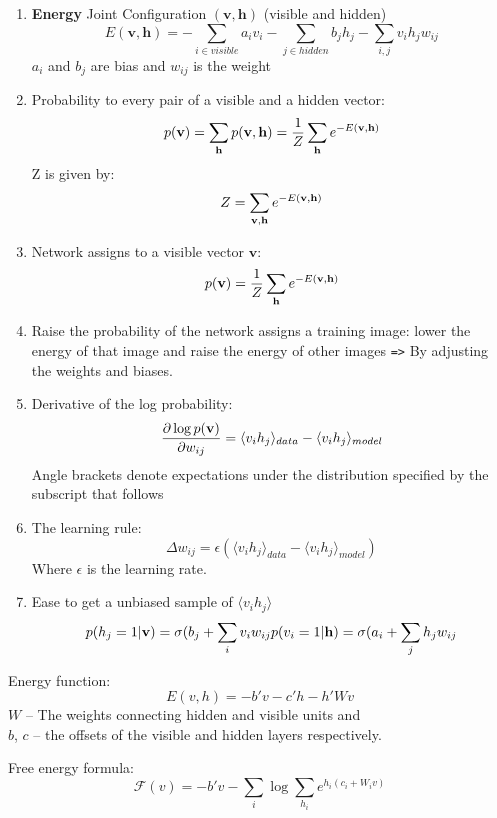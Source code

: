 \begin{enumerate}
    \item \textbf{Energy} Joint Configuration $(\mathbf{v}, \mathbf{h})$  (visible and
        hidden)
        \[ E(\mathbf{v,h}) = -\sum_{i\in visible}a_i v_i - \sum_{j\in hidden}b_j
        h_j - \sum_{i,j}v_ih_jw_{ij}\]
        $a_i$ and $b_j$ are bias and $w_{ij}$ is the weight
    \item  Probability to every pair of a visible and a hidden vector:
        \[ p(\mathbf{v}) = \sum_{\mathbf{h}} p(\mathbf{v}, \mathbf{h}) = \frac{1}{Z}\sum_{\mathbf{h}} e^{-E(\mathbf{v},
        \mathbf{h})}\]
        Z is given by:
        \[ Z = \sum_{\mathbf{v}, \mathbf{h}} e^{-E(\mathbf{v},\mathbf{h})}\]
    \item Network assigns to a visible vector $\mathbf{v}$:
        \[
            p(\mathbf{v}) = \frac{1}{Z}\sum_{\mathbf{h}} e^{-E(\mathbf{v}, \mathbf{h})}
        \]
    \item Raise the probability of the network assigns a training image:
        lower the energy of that image and raise the energy of other images
        \verb|=>| By adjusting the weights and biases.
    \item Derivative of the log probability:
        \[\frac{\partial \log{p(\mathbf{v}})}{\partial w_{ij}} = \langle
        v_ih_j\rangle_{data} - \langle v_i h_j\rangle_{model}\]
        Angle brackets denote expectations under the distribution specified by the
        subscript that follows
    \item 
        The learning rule:
        \[ \Delta w_{ij} = \epsilon(\langle
            v_ih_j\rangle_{data} - \langle v_i h_j\rangle_{model})
        \]
        Where $\epsilon$ is the learning rate.
    \item Ease to get a unbiased sample of $\langle v_ih_j \rangle$
        \begin{equation*}
            p(h_j = 1|\mathbf{v})  =  \sigma(b_j + \sum_i v_i w_{ij} \\
            p(v_i = 1|\mathbf{h})  =  \sigma(a_i + \sum_j h_j w_{ij}
        \end{equation*}
\end{enumerate}



Energy function:
\[ E(v, h) = -b'v - c'h - h'Wv\]
$W$ -- The weights connecting hidden and visible units and \\
$b$, $c$ -- the offsets of the visible and hidden layers respectively.

Free energy formula:
\[ 
    \mathcal{F}(v) = -b'v - \sum_i \log \sum_{h_i} e^{h_i(c_i+W_i v)}
\]

